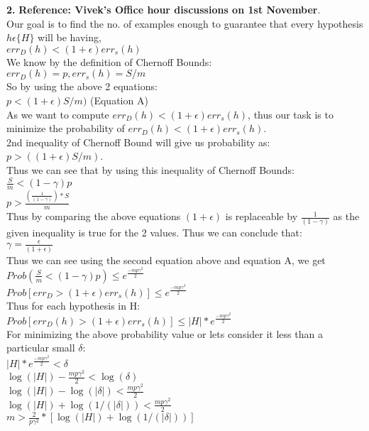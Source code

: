 \documentclass[11pt]{article}
\begin{document}
{\bf 2.}{ \bf Reference: Vivek's Office hour discussions on 1st November}.\\ 
Our goal is to find the no. of examples enough to guarantee that every hypothesis $h \epsilon \{H\}$ will be having,\\
$err_{D}(h) < (1 + \epsilon) err_{s} (h)$  \\[15pt]
We know by the definition of Chernoff Bounds:\\
$err_{D}(h) = p, err_{s}(h)=S/m$\\[15pt]
So by using the above 2 equations:\\
$p< (1+ \epsilon )S/m)$ (Equation A)\\[15pt]
As we want to compute $err_{D}(h) < (1 + \epsilon) err_{s} (h)$, thus our task is to minimize the probability of $err_{D}(h) < (1 + \epsilon) err_{s} (h)$.\\[15pt]
2nd inequality of Chernoff Bound will give us probability as:\\
$p> ((1 + \epsilon)S/m)$.\\ Thus we can see that by using this inequality of Chernoff Bounds:\\
$\frac {S}{m} < (1 - \gamma)p$\\
$p >\frac{(\frac{1} {(1 - \gamma)})*S}{m}$\\[15pt]
Thus by comparing the above equations $(1+ \epsilon)$ is replaceable by $\frac {1}{(1- \gamma)}$ as the given inequality is true for the 2 values. Thus we can conclude that:\\
$\gamma = \frac {\epsilon}{(1 + \epsilon)}$\\[15pt]
Thus we can see using the second equation above and equation A, we get\\
$Prob(\frac {S}{m} < (1- \gamma)p) \leq e^{\frac {-mp \gamma^{2}}{2}}$\\
$Prob [err_{D}>(1+\epsilon)err_{s}(h)] \leq e^{\frac {-mp \gamma^{2}}{2}}$\\[15pt]
Thus for each hypothesis in H:\\
$Prob [err_{D}(h)>(1+\epsilon)err_{s}(h)] \leq |H| * e^{\frac {-mp \gamma^{2}}{2}}$\\[15pt]
For minimizing the above probability value or lets consider it less than a particular small $\delta$:\\
$|H|*e^{\frac {-mp \gamma^{2}}{2}}< \delta$\\
$\log (|H|)-\frac {mp \gamma^{2}}{2}<\log (\delta)$\\
$\log (|H|) - \log (|\delta|)<{\frac {mp \gamma^{2}}{2}}$\\
$\log (|H|) + \log (1/(|\delta|))<{\frac {mp \gamma^{2}}{2}}$\\
$ m > \frac {2}{p\gamma^{2}}*[\log (|H|) + \log (1/(|\delta|))]$\\[15pt]
\end{document}
